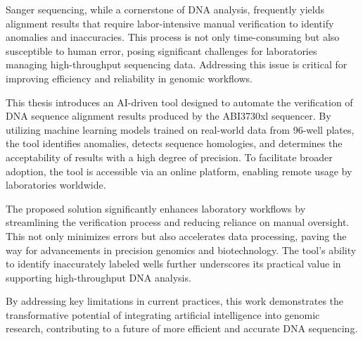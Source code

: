 
%

Sanger sequencing, while a cornerstone of DNA analysis, frequently yields alignment results that require labor-intensive manual verification to identify anomalies and inaccuracies. This process is not only time-consuming but also susceptible to human error, posing significant challenges for laboratories managing high-throughput sequencing data. Addressing this issue is critical for improving efficiency and reliability in genomic workflows.

This thesis introduces an AI-driven tool designed to automate the verification of DNA sequence alignment results produced by the ABI3730xl sequencer. By utilizing machine learning models trained on real-world data from 96-well plates, the tool identifies anomalies, detects sequence homologies, and determines the acceptability of results with a high degree of precision. To facilitate broader adoption, the tool is accessible via an online platform, enabling remote usage by laboratories worldwide.

The proposed solution significantly enhances laboratory workflows by streamlining the verification process and reducing reliance on manual oversight. This not only minimizes errors but also accelerates data processing, paving the way for advancements in precision genomics and biotechnology. The tool’s ability to identify inaccurately labeled wells further underscores its practical value in supporting high-throughput DNA analysis.

By addressing key limitations in current practices, this work demonstrates the transformative potential of integrating artificial intelligence into genomic research, contributing to a future of more efficient and accurate DNA sequencing.

